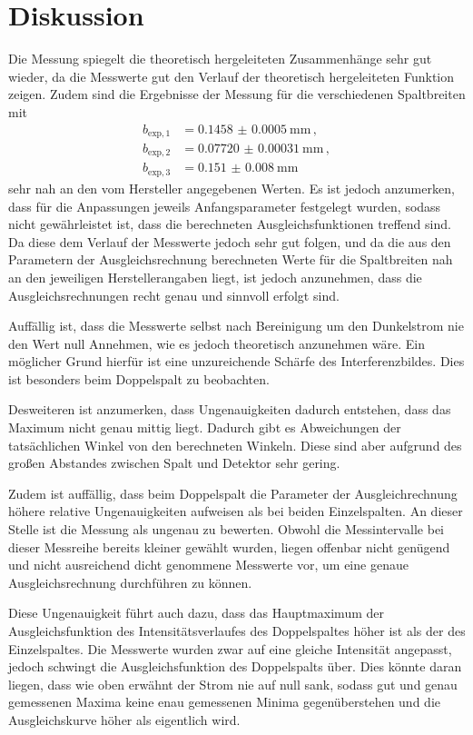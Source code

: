 \section{Diskussion}
\label{sec:Diskussion}
Die Messung spiegelt die theoretisch hergeleiteten Zusammenhänge sehr gut wieder,
da die Messwerte gut den Verlauf der theoretisch hergeleiteten Funktion zeigen. Zudem
sind die Ergebnisse der Messung für die verschiedenen Spaltbreiten mit
\begin{align*}
  b_{\text{exp},1}&=\SI{0.1458(00005)}{\milli\meter} \,, \\
  b_{\text{exp},2}&=\SI{0.07720(000031)}{\milli\meter} \,,\\
  b_{\text{exp},3}&=\SI{0.151(0008)}{\milli\meter} \,
\end{align*}
sehr nah an den vom Hersteller angegebenen Werten.
Es ist jedoch anzumerken, dass für die Anpassungen jeweils Anfangsparameter festgelegt
wurden, sodass nicht gewährleistet ist, dass die berechneten Ausgleichsfunktionen
treffend sind. Da diese dem Verlauf der Messwerte jedoch sehr gut folgen, und da
die aus den Parametern der Ausgleichsrechnung berechneten Werte für die Spaltbreiten
nah an den jeweiligen Herstellerangaben liegt, ist jedoch
anzunehmen, dass die Ausgleichsrechnungen recht genau und sinnvoll erfolgt sind.

Auffällig ist, dass die Messwerte selbst nach Bereinigung um den Dunkelstrom nie
den Wert null Annehmen, wie es jedoch  theoretisch anzunehmen wäre. Ein möglicher Grund
hierfür ist eine unzureichende Schärfe des Interferenzbildes. Dies ist besonders beim
Doppelspalt zu beobachten.

Desweiteren ist anzumerken, dass Ungenauigkeiten dadurch entstehen, dass das Maximum
nicht genau mittig liegt. Dadurch gibt es Abweichungen der tatsächlichen Winkel
von den berechneten Winkeln. Diese sind aber aufgrund des großen Abstandes zwischen
Spalt und Detektor sehr gering.

Zudem ist auffällig, dass beim Doppelspalt die Parameter der Ausgleichrechnung höhere
relative Ungenauigkeiten aufweisen als bei beiden Einzelspalten.
An dieser Stelle ist die Messung als ungenau zu bewerten. Obwohl die Messintervalle
bei dieser Messreihe bereits kleiner gewählt wurden, liegen offenbar nicht genügend
und nicht ausreichend dicht genommene Messwerte vor, um eine genaue Ausgleichsrechnung durchführen zu können.

Diese Ungenauigkeit führt auch dazu, dass das Hauptmaximum der Ausgleichsfunktion des Intensitätsverlaufes des
Doppelspaltes höher ist als der des Einzelspaltes. Die Messwerte wurden zwar auf
eine gleiche Intensität angepasst, jedoch schwingt die Ausgleichsfunktion des Doppelspalts
über. Dies könnte daran liegen, dass wie oben erwähnt der Strom nie auf null sank, sodass
gut und genau gemessenen Maxima keine enau gemessenen Minima gegenüberstehen und
die Ausgleichskurve höher als eigentlich wird.
